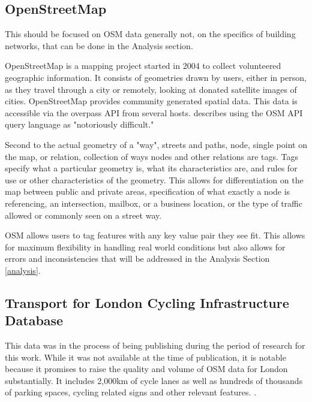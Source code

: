
\subsection{OpenStreetMap}

This should be focused on OSM data generally not, on the specifics of building networks, that can be done in the Analysis section. 


OpenStreetMap is a mapping project started in 2004 to collect volunteered geographic information. It consists of geometries drawn by users, either in person, as they travel through a city or remotely, looking at donated satellite images of cities. OpenStreetMap provides community generated spatial data. This data is accessible via the overpass API from several hosts. \cite{osmnx} describes using the OSM API query language as "notoriously difficult." 


Second to the actual geometry of a "way", streets and paths, node, single point on the map, or relation, collection of ways nodes and other relations are tags. Tags specify what a particular geometry is, what its characteristics are, and rules for use or other characteristics of the geometry. This allows for differentiation on the map between public and private areas, specification of what exactly a node is referencing, an intersection, mailbox, or a business location, or the type of traffic allowed or commonly seen on a street way. 

OSM allows users to tag features with any key value pair they see fit. This allows for maximum flexibility in handling real world conditions but also allows for errors and inconsistencies that will be addressed in the Analysis Section \ref{analysis}.

\subsection{Transport for London Cycling Infrastructure Database}

\cite{tflcid}

This data was in the process of being publishing during the period of research for this work. While it was not available at the time of publication, it is notable because it promises to raise the quality and volume of OSM data for London substantially. It includes 2,000km of cycle lanes as well as hundreds of thousands of parking spaces, cycling related signs and other relevant features. \cite{osmtflcidwiki}. 

